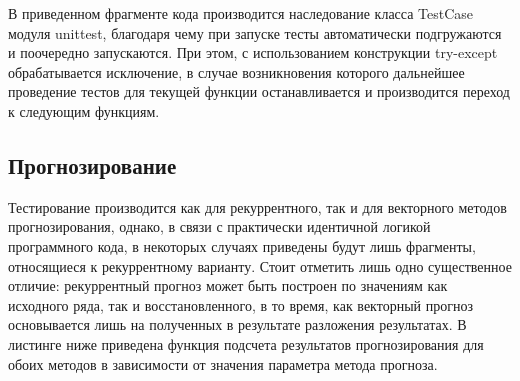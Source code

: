 \documentclass[specialist,
			   substylefile = spbu_report.rtx,
			   subf,href,colorlinks=true, 12pt]{disser}
\begin{document}
В приведенном фрагменте кода производится наследование класса TestCase модуля unittest, благодаря чему при запуске тесты автоматически подгружаются и поочередно запускаются. При этом, с использованием конструкции try-except обрабатывается исключение, в случае возникновения которого дальнейшее проведение тестов для текущей функции останавливается и производится переход к следующим функциям.


\subsection{Прогнозирование}

Тестирование производится как для рекуррентного, так и для векторного методов прогнозирования, однако, в связи с практически идентичной логикой программного кода, в некоторых случаях приведены будут лишь фрагменты, относящиеся к рекуррентному варианту. Стоит отметить лишь одно существенное отличие: рекуррентный прогноз может быть построен по значениям как исходного ряда, так и восстановленного, в то время, как векторный прогноз основывается лишь на полученных в результате разложения результатах. В листинге ниже приведена функция подсчета результатов прогнозирования для обоих методов в зависимости от значения параметра метода прогноза.
\end{document}
